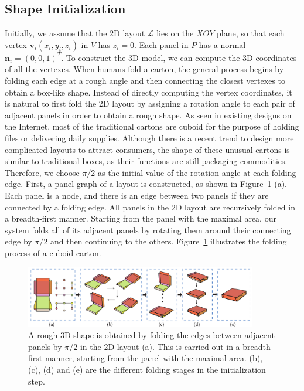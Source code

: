 
\subsection{Shape Initialization}
\label{sec:initialization}


Initially, we assume that the 2D layout $\mathcal{L}$ lies on the $XOY$ plane, so that each vertex $\mathbf{v}_i(x_i,y_i,z_i)$ in $V$ has $z_i=0$. 
Each panel in $P$ has a normal $\mathbf{n}_i=(0,0,1)^T$. 
To construct the 3D model, we can compute the 3D coordinates of all the vertexes. 
%
When humans fold a carton, the general process begins by folding each edge at a rough angle and then connecting the closest vertexes to obtain a box-like shape. 
%
Instead of directly computing the vertex coordinates, it is natural to first fold the 2D layout by assigning a rotation angle to each pair of adjacent panels in order to obtain a rough shape.
%
As seen in existing designs on the Internet, most of the traditional cartons are cuboid for the purpose of holding files or delivering daily supplies. 
Although there is a recent trend to design more complicated layouts to attract consumers, the shape of these unusual cartons is similar to traditional boxes, as their functions are still packaging commodities. 
%
Therefore, we choose $\pi/2$ as the initial value of the rotation angle at each folding edge. 
%
First, a panel graph of a layout is constructed, as shown in Figure~\ref{fig:midresult} (a).
Each panel is a node, and there is an edge between two panels if they are connected by a folding edge.
%
All panels in the 2D layout are recursively folded in a breadth-first manner.
Starting from the panel with the maximal area, our system folds all of its adjacent panels by rotating them around their connecting edge by $\pi/2$ and then continuing to the others. 
Figure~\ref{fig:midresult} illustrates the folding process of a cuboid carton. 

\begin{figure}
	\centering
	\includegraphics[width=0.9\textwidth]{images/midresult}
	\caption{A rough 3D shape is obtained by folding the edges between adjacent panels by $\pi/2$ in the 2D layout (a). This is carried out in a breadth-first manner, starting from the panel with the maximal area. (b), (c), (d) and (e) are the different folding stages in the initialization step.}
	\label{fig:midresult}
\end{figure}



